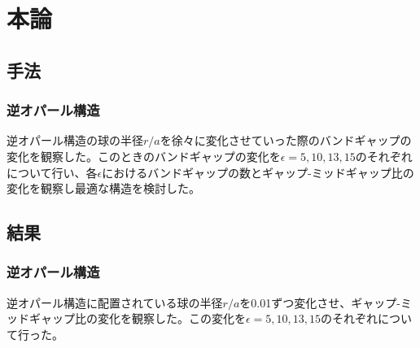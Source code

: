 \documentclass[platex,dvipdfmx]{jsreport}
\numberwithin{equation}{section}
\begin{document}
\chapter{本論}

\section{手法}
\subsection{逆オパール構造}
逆オパール構造の球の半径$r / a$を徐々に変化させていった際のバンドギャップの変化を観察した。このときのバンドギャップの変化を$\epsilon = 5, 10, 13, 15$のそれぞれについて行い、各$\epsilon$におけるバンドギャップの数とギャップ-ミッドギャップ比の変化を観察し最適な構造を検討した。


\section{結果}
\subsection{逆オパール構造}
逆オパール構造に配置されている球の半径$r / a$を0.01ずつ変化させ、ギャップ-ミッドギャップ比の変化を観察した。この変化を$\epsilon = 5, 10, 13, 15$のそれぞれについて行った。
\end{document}
